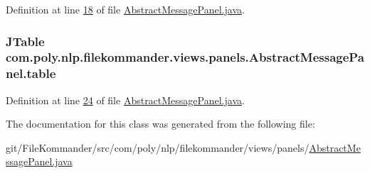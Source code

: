 Definition at line \hyperlink{L18}{18} of file \hyperlink{}{Abstract\-Message\-Panel.\-java}.

\hypertarget{classcom_1_1poly_1_1nlp_1_1filekommander_1_1views_1_1panels_1_1_abstract_message_panel_ab00e095308fb951695dc4fefe0d86cb3}{
\subsubsection[{table}]{\setlength{\rightskip}{0pt plus 5cm}J\-Table com.\-poly.\-nlp.\-filekommander.\-views.\-panels.\-Abstract\-Message\-Panel.\-table\hspace{0.3cm}{\ttfamily [private]}}}\label{classcom_1_1poly_1_1nlp_1_1filekommander_1_1views_1_1panels_1_1_abstract_message_panel_ab00e095308fb951695dc4fefe0d86cb3}


Definition at line \hyperlink{L24}{24} of file \hyperlink{}{Abstract\-Message\-Panel.\-java}.



The documentation for this class was generated from the following file\-:\begin{DoxyCompactItemize}
\item 
git/\-File\-Kommander/src/com/poly/nlp/filekommander/views/panels/\hyperlink{_abstract_message_panel_8java}{Abstract\-Message\-Panel.\-java}\end{DoxyCompactItemize}
